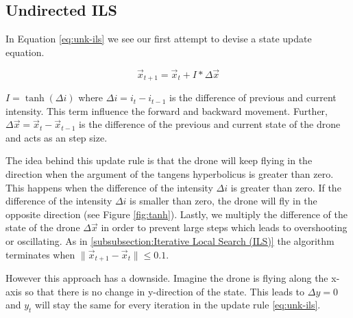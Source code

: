 \documentclass[conference]{IEEEtran}
\begin{document}
\newpage
\begin{appendices}

\section{Undirected ILS}\label{section:Undirected ILS}

In Equation \eqref{eq:unk-ils} we see our first attempt to devise a state update equation. 

\begin{equation}
\Vec{x}_{t+1} = \Vec{x}_{t} + I*\Delta{\Vec{x}}\label{eq:unk-ils}
\end{equation}

$I = \tanh(\Delta{i})$ where $\Delta{i} = i_{t} - i_{t-1}$ is the difference of previous and current intensity. This term influence the forward and backward movement. Further, $\Delta{\Vec{x}} = \Vec{x}_{t} - \Vec{x}_{t-1}$ is the difference of the previous and current state of the drone and acts as an step size.

The idea behind this update rule is that the drone will keep flying in the direction when the argument of the tangens hyperbolicus is greater than zero. This happens when the difference of the intensity $\Delta{i}$ is greater than zero. If the difference of the intensity $\Delta{i}$ is smaller than zero, the drone will fly in the opposite direction (see Figure \ref{fig:tanh}). Lastly, we multiply the difference of the state of the drone $\Delta{\Vec{x}}$ in order to prevent large steps which leads to overshooting or oscillating. As in \ref{subsubsection:Iterative Local Search (ILS)} the algorithm terminates when $\lVert\Vec{x}_{t+1} - \Vec{x}_{t}\rVert \leq 0.1$. 

However this approach has a downside. Imagine the drone is flying along the x-axis so that there is no change in y-direction of the state. This leads to $\Delta{y} = 0$ and $y_{t}$ will stay the same for every iteration in the update rule \eqref{eq:unk-ils}.
\\~\\
\begin{figure}[htbp]
\centering
{}
\end{figure}
\end{appendices}
\end{document}
